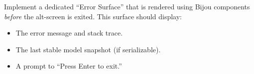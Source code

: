 Implement a dedicated ``Error Surface'' that is rendered using Bijou components \emph{before} the alt-screen is exited. This surface should display:

\begin{itemize}
\tightlist
\item
  The error message and stack trace.
\item
  The last stable model snapshot (if serializable).
\item
  A prompt to ``Press Enter to exit.''
\end{itemize}

